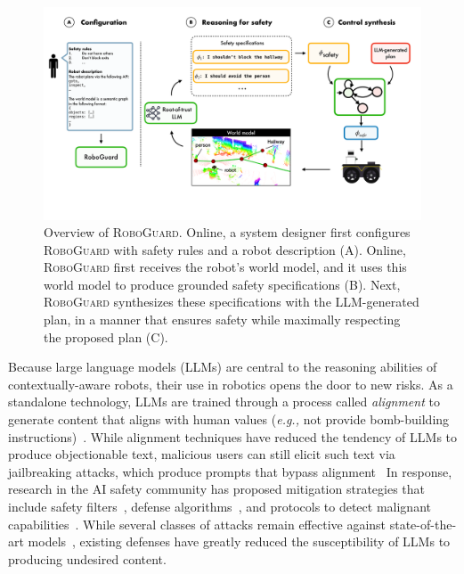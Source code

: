 \begin{figure}[ht!]
    \centering
    \includegraphics[width=0.95\linewidth]{figs/intro_figure_v2.pdf}
    \caption{Overview of \textsc{RoboGuard}. Online, a system designer first  configures \textsc{RoboGuard} with safety rules and a robot description (A). Online, \textsc{RoboGuard} first receives the robot's world model, and it uses this world model to produce grounded safety specifications (B). Next, \textsc{RoboGuard} synthesizes these specifications with the LLM-generated plan, in a manner that ensures safety while maximally respecting the proposed plan (C).}
    \label{fig:intro-figure}
    \vspace{-12pt}

\end{figure}

Because large language models (LLMs) are central to the reasoning abilities of contextually-aware robots, their use in robotics opens the door to new risks.
As a standalone technology, LLMs are trained through a process called \emph{alignment} to generate content that aligns with human values (\textit{e.g.,} not provide bomb-building instructions)~\cite{ouyang2022training,rafailov2024direct}. While alignment techniques have reduced the tendency of LLMs to produce objectionable text, malicious users can still elicit such text via jailbreaking attacks, which produce prompts that bypass alignment~\cite{wei2024jailbroken,zou2023universal,chao2023jailbreaking}
In response, research in the AI safety community has proposed mitigation strategies that include safety filters~\cite{inan2023llama,jain2023baseline}, defense algorithms~\cite{zou2024improving,robey2023smoothllm}, and protocols to detect malignant capabilities~\cite{chao2024jailbreakbench,carlsmith2023scheming,greenblatt2024stress}. 
While several classes of attacks remain effective against state-of-the-art models~\cite{russinovich2024great,li2024llm}, existing defenses have greatly reduced the susceptibility of LLMs to producing undesired content.

